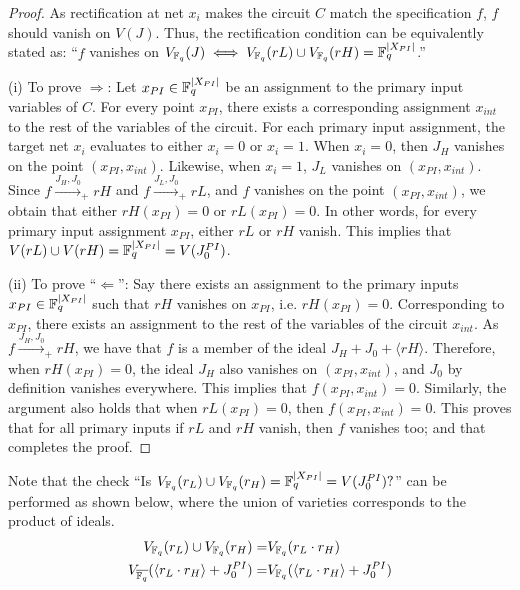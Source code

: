 \begin{proof}
As rectification at net $x_i$ makes the circuit $C$ match the
specification $f$, $f$ should vanish on $V(J)$. Thus, the
rectification condition can be equivalently stated as:
``$f$ vanishes on $V_{{\mathbb{F}}_{q}}(J) \iff V_{{\mathbb{F}}_{q}}(rL) \cup V_{{\mathbb{F}}_{q}}(rH) =
  {\mathbb{F}}_{q}^{|X_{PI}|}$.''

(i) To prove $\Rightarrow$: Let $x_{PI} \in {\mathbb{F}}_{q}^{|X_{PI}|}$ be an
assignment to the primary input variables of $C$. For every point
$x_{PI}$, there exists a corresponding assignment $x_{int}$ to the
rest of the variables of the circuit. For each primary input assignment,
the target net $x_i$ evaluates to either $x_i = 0$ or $x_i = 1$. When
$x_i = 0$, then $J_H$ vanishes on the point $(x_{PI},
x_{int})$. Likewise, when $x_i = 1$, $J_L$ vanishes on $(x_{PI},
x_{int})$. Since $f\xrightarrow{J_H,J_0}_+rH$ and
$f\xrightarrow{J_L,J_0}_+rL$, and $f$ vanishes on the point
$(x_{PI},x_{int})$, we obtain that either $rH(x_{PI}) = 0$ or
$rL(x_{PI}) = 0$. In other words, for every 
primary input assignment $x_{PI}$, either $rL$ or $rH$ vanish. This
implies that $V(rL) \cup V(rH) = {\mathbb{F}}_{q}^{|X_{PI}|} = V(J_0^{PI})$.

(ii) To prove ``$\Leftarrow$'': Say there exists an assignment to the
primary inputs $x_{PI} \in {\mathbb{F}}_{q}^{|X_{PI}|}$ such that $rH$ vanishes on
$x_{PI}$, i.e. $rH(x_{PI})=0$. Corresponding to $x_{PI}$, there exists
an assignment to the rest of the variables of the circuit $x_{int}$. 
As $f\xrightarrow{J_H, J_0}_+ rH$, we have that $f$ is a member of the
ideal $J_H + J_0 + \langle rH \rangle$. Therefore, when
$rH(x_{PI})=0$, the ideal $J_H$ also vanishes on $(x_{PI},x_{int})$,
and $J_0$ by definition vanishes everywhere. This implies that
$f(x_{PI},x_{int})=0$. Similarly, the argument also holds that when
$rL(x_{PI})=0$, then $f(x_{PI},x_{int})=0$. This proves that for all
primary inputs if $rL$ and $rH$ vanish, then $f$ vanishes too; and
that completes the proof.


  
\end{proof}

Note that the check ``Is $V_{{\mathbb{F}}_{q}}(r_L) \cup V_{{\mathbb{F}}_{q}}(r_H) =
{\mathbb{F}}_{q}^{|X_{PI}|} = V(J_0^{PI})?$'' can be performed as shown below,
where the union of varieties corresponds to the product of ideals.
\begin{align}
 V_{{\mathbb{F}}_{q}}(r_L) \cup V_{{\mathbb{F}}_{q}}(r_H)  =&V_{{\mathbb{F}}_{q}}(r_L\cdot r_H)\\
  V_{{\overline{{\mathbb{F}}_q}}}(\langle r_L\cdot r_H \rangle+ J_0^{PI}) =&V_{{\mathbb{F}}_{q}}(\langle r_L\cdot r_H \rangle+ J_0^{PI})
\end{align}

